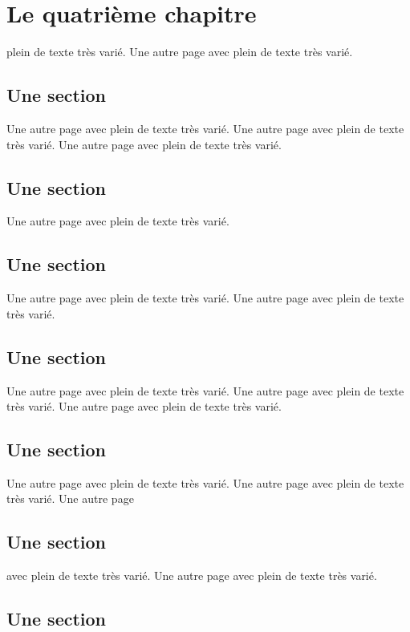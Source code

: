 \documentclass[11pt]{thesul}
\begin{document}
\chapter{Le quatri\`eme chapitre}

plein de texte très varié.
Une autre page avec plein de texte très varié.

\section{Une section}

Une autre page avec plein de texte très varié.
Une autre page avec plein de texte très varié.
Une autre page avec plein de texte très varié.

\section{Une section}

Une autre page avec plein de texte très varié.

\section{Une section}

Une autre page avec plein de texte très varié.
Une autre page avec plein de texte très varié.

\section{Une section}

Une autre page avec plein de texte très varié.
Une autre page avec plein de texte très varié.
Une autre page avec plein de texte très varié.

\section{Une section}

Une autre page avec plein de texte très varié.
Une autre page avec plein de texte très varié.
Une autre page


\section{Une section}

avec plein de texte très varié.
Une autre page avec plein de texte très varié.

\section{Une section}
\end{document}
